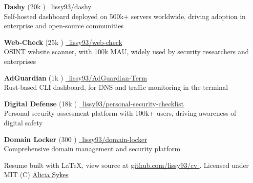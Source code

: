 \documentclass[]{resume-format}
\begin{document}
\vspace{0.5mm}
\begin{cvachievements}
  \setlength{\itemsep}{0mm}
  \item {\hspace{-5pt}
    \textbf{ Dashy } (20k \raisebox{0.5pt}{\scriptsize\faStar}) \href{ https://dashy.to }{\scriptsize\color{lightgray}\faLink} \hfill \href{https://github.com/lissy93/dashy}{\hspace{1pt}\faGithub\ lissy93/dashy}\\
    Self-hosted dashboard deployed on 500k+ servers worldwide, driving adoption in enterprise and open-source communities
  }
  \item {\hspace{-5pt}
    \textbf{ Web-Check } (25k \raisebox{0.5pt}{\scriptsize\faStar}) \href{ https://web-check.xyz }{\scriptsize\color{lightgray}\faLink} \hfill \href{https://github.com/lissy93/web-check}{\hspace{1pt}\faGithub\ lissy93/web-check}\\
    OSINT website scanner, with 100k MAU, widely used by security researchers and enterprises
  }
  \item {\hspace{-5pt}
    \textbf{ AdGuardian } (1k \raisebox{0.5pt}{\scriptsize\faStar}) \href{ https://adguardian.as93.net/ }{\scriptsize\color{lightgray}\faLink} \hfill \href{https://github.com/lissy93/AdGuardian-Term}{\hspace{1pt}\faGithub\ lissy93/AdGuardian-Term}\\
    Rust-based CLI dashboard, for DNS and traffic monitoring in the terminal
  }
  \item {\hspace{-5pt}
    \textbf{ Digital Defense } (18k \raisebox{0.5pt}{\scriptsize\faStar}) \href{ https://digital-defense.io/ }{\scriptsize\color{lightgray}\faLink} \hfill \href{https://github.com/lissy93/personal-security-checklist}{\hspace{1pt}\faGithub\ lissy93/personal-security-checklist}\\
    Personal security assessment platform with 100k+ users, driving awareness of digital safety
  }
  \item {\hspace{-5pt}
    \textbf{ Domain Locker } (300 \raisebox{0.5pt}{\scriptsize\faStar}) \href{ https://domain-locker.com/ }{\scriptsize\color{lightgray}\faLink} \hfill \href{https://github.com/lissy93/domain-locker}{\hspace{1pt}\faGithub\ lissy93/domain-locker}\\
    Comprehensive domain management and security platform
  }
\end{cvachievements}



\vspace{5mm}
\begin{center}
    \tiny\color{lightgray}
    Resume built with LaTeX, view source at
    \href{https://github.com/lissy93/cv}{ github.com/lissy93/cv }.
    Licensed under MIT (C)
    \href{https://aliciasykes.com}{ Alicia Sykes } {\the\year}
\end{center}
\ 
\end{document}
